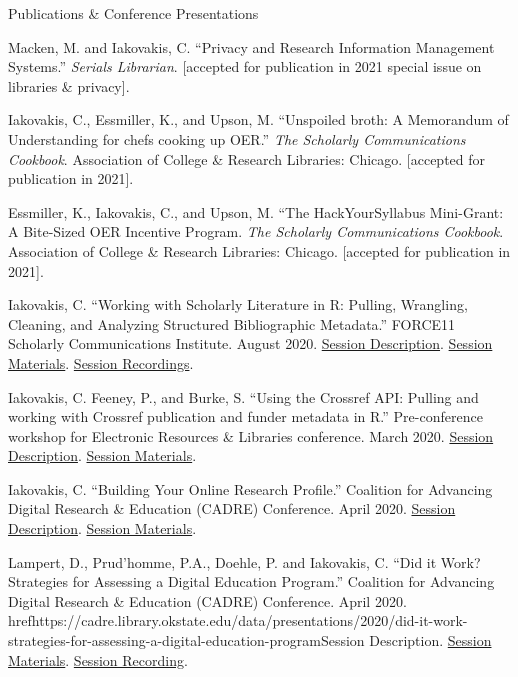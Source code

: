 \documentclass{resume} %
\begin{document}
\begin{rSection}{Publications \& Conference Presentations}

\begin{rSubsectionConf}{2em}
	
Macken, M. and Iakovakis, C. “Privacy and Research Information Management Systems.” \textit{Serials Librarian}. [accepted for publication in 2021 special issue on libraries \& privacy].

Iakovakis, C., Essmiller, K., and Upson, M. “Unspoiled broth: A Memorandum of Understanding for chefs cooking up OER.” \textit{The Scholarly Communications Cookbook}. Association of College \& Research Libraries: Chicago. [accepted for publication in 2021].

Essmiller, K., Iakovakis, C., and Upson, M. “The HackYourSyllabus Mini-Grant: A Bite-Sized OER Incentive Program. \textit{The Scholarly Communications Cookbook}. Association of College \& Research Libraries: Chicago. [accepted for publication in 2021].

Iakovakis, C. ``Working with Scholarly Literature in R: Pulling, Wrangling, Cleaning, and Analyzing Structured Bibliographic Metadata.''  FORCE11 Scholarly Communications Institute. August 2020. \href{https://www.force11.org/fsci/2020/fsci-2020-course-abstracts#W24}{Session Description}. \href{https://ciakovx.github.io/fsci_syllabus.html}{Session Materials}. \href{https://osf.io/ubd9r/}{Session Recordings}. 
 
Iakovakis, C. Feeney, P., and Burke, S. ``Using the Crossref API: Pulling and working with Crossref publication and funder metadata in R.'' Pre-conference workshop for Electronic Resources \& Libraries conference. March 2020. \href{https://sched.co/XVhQ}{Session Description}. \href{https://osf.io/tz246/}{Session Materials}.

Iakovakis, C. ``Building Your Online Research Profile.” Coalition for Advancing Digital Research \& Education (CADRE) Conference. April 2020. \href{https://cadre.library.okstate.edu/data/presentations/2020/building-your-online-research-profile}{Session Description}. \href{https://cadre.library.okstate.edu/sub-domains/cadre/presentations/Iakovakis_Building_Profile_CADRE.pdf}{Session Materials}.

Lampert, D., Prud’homme, P.A., Doehle, P. and Iakovakis, C. ``Did it Work? Strategies for Assessing a Digital Education Program.” Coalition for Advancing Digital Research \& Education (CADRE) Conference. April 2020. href{https://cadre.library.okstate.edu/data/presentations/2020/did-it-work-strategies-for-assessing-a-digital-education-program}{Session Description}. \href{https://cadre.library.okstate.edu/sub-domains/cadre/presentations/doehle_diditwork.pptx}{Session Materials}. \href{https://osf.io/vj72t/}{Session Recording}.


\end{rSubsectionConf}
\end{rSection}
\end{document}
